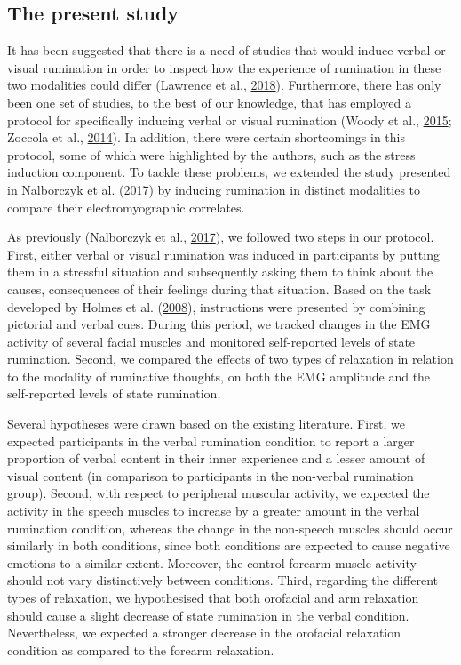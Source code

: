 \documentclass[a4paper,12pt,twoside,openright,oldfontcommands]{memoir}
\begin{document}
\hypertarget{the-present-study}{%
\subsection{The present study}\label{the-present-study}}

It has been suggested that there is a need of studies that would induce verbal or visual rumination in order to inspect how the experience of rumination in these two modalities could differ (Lawrence et al., \protect\hyperlink{ref-lawrence_visual_2018}{2018}). Furthermore, there has only been one set of studies, to the best of our knowledge, that has employed a protocol for specifically inducing verbal or visual rumination (Woody et al., \protect\hyperlink{ref-woody_trait_2015}{2015}; Zoccola et al., \protect\hyperlink{ref-zoccola_cardiovascular_2014}{2014}). In addition, there were certain shortcomings in this protocol, some of which were highlighted by the authors, such as the stress induction component. To tackle these problems, we extended the study presented in Nalborczyk et al. (\protect\hyperlink{ref-nalborczyk_orofacial_2017}{2017}) by inducing rumination in distinct modalities to compare their electromyographic correlates.

As previously (Nalborczyk et al., \protect\hyperlink{ref-nalborczyk_orofacial_2017}{2017}), we followed two steps in our protocol. First, either verbal or visual rumination was induced in participants by putting them in a stressful situation and subsequently asking them to think about the causes, consequences of their feelings during that situation. Based on the task developed by Holmes et al. (\protect\hyperlink{ref-holmes_causal_2008}{2008}), instructions were presented by combining pictorial and verbal cues. During this period, we tracked changes in the EMG activity of several facial muscles and monitored self-reported levels of state rumination. Second, we compared the effects of two types of relaxation in relation to the modality of ruminative thoughts, on both the EMG amplitude and the self-reported levels of state rumination.

Several hypotheses were drawn based on the existing literature. First, we expected participants in the verbal rumination condition to report a larger proportion of verbal content in their inner experience and a lesser amount of visual content (in comparison to participants in the non-verbal rumination group). Second, with respect to peripheral muscular activity, we expected the activity in the speech muscles to increase by a greater amount in the verbal rumination condition, whereas the change in the non-speech muscles should occur similarly in both conditions, since both conditions are expected to cause negative emotions to a similar extent. Moreover, the control forearm muscle activity should not vary distinctively between conditions. Third, regarding the different types of relaxation, we hypothesised that both orofacial and arm relaxation should cause a slight decrease of state rumination in the verbal condition. Nevertheless, we expected a stronger decrease in the orofacial relaxation condition as compared to the forearm relaxation.
\end{document}
